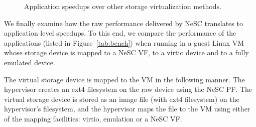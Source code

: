 \begin{figure}[t]

  \centering
  \caption{Application speedups over other storage virtualization methods.\label{fig:apps}}

    
\end{figure}

We finally examine how the raw performance delivered by NeSC translates to application level speedups. To this end, we compare the performance of the  applications (listed in Figure~\ref{tab:bench}) when running in a guest Linux VM whose storage device is mapped to a NeSC VF, to a virtio device and to a fully emulated device.

The virtual storage device is mapped to the VM in the following manner. The hypervisor creates an ext4 filesystem on the raw device using the NeSC PF. The virtual storage device is stored as an image file (with ext4 filesystem) on  the hypervisor's filesystem, and the hypervisor maps the file to the VM using either of the mapping facilities: virtio, emulation or a NeSC VF.

